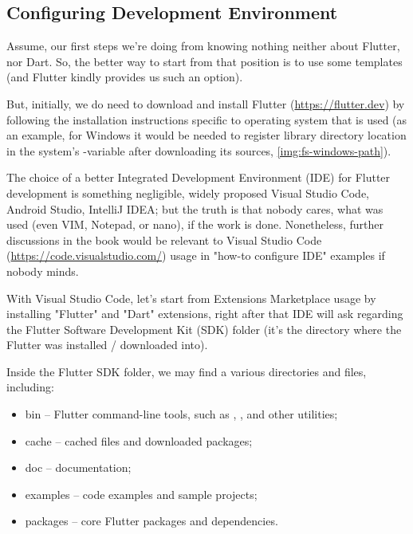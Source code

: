 
\subsection{Configuring Development Environment} \label{first-step}

Assume, our first steps we're doing from knowing nothing neither about Flutter, nor Dart. So, the better way to start 
from that position is to use some templates (and Flutter kindly provides us such an option).

But, initially, we do need to download and install Flutter (\href{https://flutter.dev}{https://flutter.dev}) by 
following the installation instructions specific to operating system that is used (as an example, for Windows it 
would be needed to register library directory location in the system's -variable after downloading its sources, 
\cref{img:fs-windows-path}).


The choice of a better Integrated Development Environment (IDE) for Flutter development is something negligible, widely
proposed Visual Studio Code, Android Studio, IntelliJ IDEA; but the truth is that nobody cares, what was used (even VIM,
Notepad, or nano), if the work is done. Nonetheless, further discussions in the book would be relevant to Visual 
Studio Code (\href{https://code.visualstudio.com/}{https://code.visualstudio.com/}) usage in "how-to configure IDE" 
examples if nobody minds.

With Visual Studio Code, let's start from Extensions Marketplace usage by installing "Flutter" and "Dart" extensions, 
right after that IDE will ask regarding the Flutter Software Development Kit (SDK) folder (it's the directory where 
the Flutter was installed / downloaded into).

Inside the Flutter SDK folder, we may find a various directories and files, including:

\begin{itemize}
  \item bin -- Flutter command-line tools, such as , , and other utilities;
  \item cache -- cached files and downloaded packages;
  \item doc -- documentation;
  \item examples -- code examples and sample projects;
  \item packages -- core Flutter packages and dependencies.
\end{itemize}

